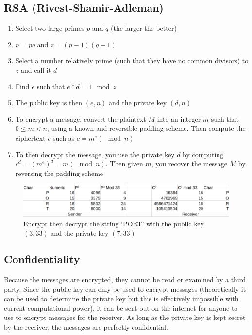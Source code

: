 \subsection*{RSA (Rivest-Shamir-Adleman)}

\begin{enumerate}
  \item Select two large primes $p$ and $q$ (the larger the better)
  \item $n = pq$ and $z = (p - 1)(q - 1)$
  \item Select a number relatively prime (such that they have no common divisors) to $z$ and call it $d$
  \item Find $e$ such that $e * d = 1 \mod z$
  \item The public key is then $(e, n)$ and the private key $(d, n)$
  \item To encrypt a message, convert the plaintext $M$ into an integer $m$ such that $0 \leq m < n$, using a known
   and reversible padding scheme. Then compute the ciphertext $c$ such as $c = m^e (\mod n)$
  \item To then decrypt the message, you use the private key $d$ by computing $c^d = {(m^e)}^d = m (\mod n)$. Then given
   $m$, you recover the message $M$ by reversing the padding scheme
\end{enumerate}

\begin{figure}[h]
  \caption{Encrypt then decrypt the string `PORT' with the public key $(3, 33)$ and the private key $(7, 33)$}
  \includegraphics[width=0.9\linewidth]{assets/lect3-ex1.png}
  \centering
\end{figure}

\subsection*{Confidentiality}

Because the messages are encrypted, they cannot be read or examined by a third party. Since the public key can only be
 used to encrypt messages (theoretically it can be used to determine the private key but this is effectively impossible
 with current computational power), it can be sent out on the internet for anyone to use to encrypt messages for the
 receiver. As long as the private key is kept secret by the receiver, the messages are perfectly confidential.

